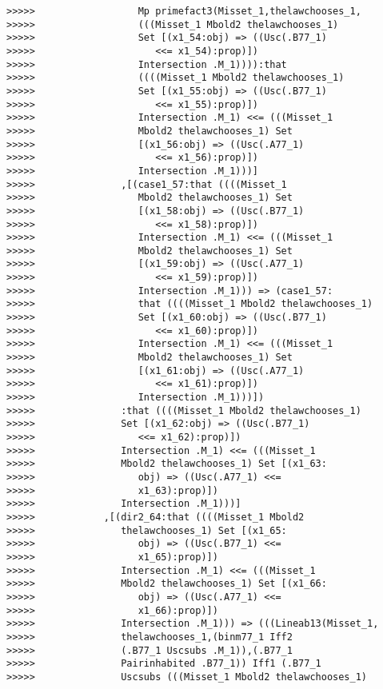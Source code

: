 \documentclass[12pt]{article}
\begin{document}
\begin{verbatim}
>>>>>                  Mp primefact3(Misset_1,thelawchooses_1,
>>>>>                  (((Misset_1 Mbold2 thelawchooses_1)
>>>>>                  Set [(x1_54:obj) => ((Usc(.B77_1)
>>>>>                     <<= x1_54):prop)])
>>>>>                  Intersection .M_1)))):that
>>>>>                  ((((Misset_1 Mbold2 thelawchooses_1)
>>>>>                  Set [(x1_55:obj) => ((Usc(.B77_1)
>>>>>                     <<= x1_55):prop)])
>>>>>                  Intersection .M_1) <<= (((Misset_1
>>>>>                  Mbold2 thelawchooses_1) Set
>>>>>                  [(x1_56:obj) => ((Usc(.A77_1)
>>>>>                     <<= x1_56):prop)])
>>>>>                  Intersection .M_1)))]
>>>>>               ,[(case1_57:that ((((Misset_1
>>>>>                  Mbold2 thelawchooses_1) Set
>>>>>                  [(x1_58:obj) => ((Usc(.B77_1)
>>>>>                     <<= x1_58):prop)])
>>>>>                  Intersection .M_1) <<= (((Misset_1
>>>>>                  Mbold2 thelawchooses_1) Set
>>>>>                  [(x1_59:obj) => ((Usc(.A77_1)
>>>>>                     <<= x1_59):prop)])
>>>>>                  Intersection .M_1))) => (case1_57:
>>>>>                  that ((((Misset_1 Mbold2 thelawchooses_1)
>>>>>                  Set [(x1_60:obj) => ((Usc(.B77_1)
>>>>>                     <<= x1_60):prop)])
>>>>>                  Intersection .M_1) <<= (((Misset_1
>>>>>                  Mbold2 thelawchooses_1) Set
>>>>>                  [(x1_61:obj) => ((Usc(.A77_1)
>>>>>                     <<= x1_61):prop)])
>>>>>                  Intersection .M_1)))])
>>>>>               :that ((((Misset_1 Mbold2 thelawchooses_1)
>>>>>               Set [(x1_62:obj) => ((Usc(.B77_1)
>>>>>                  <<= x1_62):prop)])
>>>>>               Intersection .M_1) <<= (((Misset_1
>>>>>               Mbold2 thelawchooses_1) Set [(x1_63:
>>>>>                  obj) => ((Usc(.A77_1) <<=
>>>>>                  x1_63):prop)])
>>>>>               Intersection .M_1)))]
>>>>>            ,[(dir2_64:that ((((Misset_1 Mbold2
>>>>>               thelawchooses_1) Set [(x1_65:
>>>>>                  obj) => ((Usc(.B77_1) <<=
>>>>>                  x1_65):prop)])
>>>>>               Intersection .M_1) <<= (((Misset_1
>>>>>               Mbold2 thelawchooses_1) Set [(x1_66:
>>>>>                  obj) => ((Usc(.A77_1) <<=
>>>>>                  x1_66):prop)])
>>>>>               Intersection .M_1))) => (((Lineab13(Misset_1,
>>>>>               thelawchooses_1,(binm77_1 Iff2
>>>>>               (.B77_1 Uscsubs .M_1)),(.B77_1
>>>>>               Pairinhabited .B77_1)) Iff1 (.B77_1
>>>>>               Uscsubs (((Misset_1 Mbold2 thelawchooses_1)

\end{verbatim}
\end{document}

